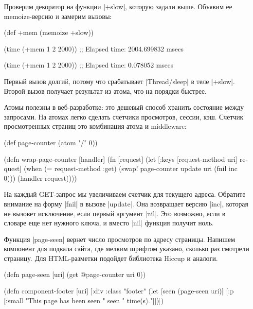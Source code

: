Проверим декоратор на функции \spverb|+slow|, которую задали выше. Объявим ее
memoize-версию и замерим вызовы:

\begin{english}
  \begin{clojure}
(def +mem (memoize +slow))

(time (+mem 1 2 2000))
;; Elapsed time: 2004.699832 msecs

(time (+mem 1 2 2000))
;; Elapsed time: 0.078052 msecs
  \end{clojure}
\end{english}

Первый вызов долгий, потому что срабатывает \spverb|Thread/sleep| в теле
\spverb|+slow|. Второй вызов получает результат из атома, что на порядки
быстрее.

Атомы полезны в веб-разработке: это дешевый способ хранить состояние между
запросами. На атомах легко сделать счетчики просмотров, сессии, кэш. Счетчик
просмотренных страниц это комбинация атома и middleware:

\begin{english}
  \begin{clojure}
(def page-counter
  (atom {"/" 0}))

(defn wrap-page-counter
  [handler]
  (fn [request]
    (let [{:keys [request-method uri]} request]
      (when (= request-method :get)
        (swap! page-counter update uri (fnil inc 0)))
      (handler request))))
  \end{clojure}
\end{english}

На каждый GET-запрос мы увеличиваем счетчик для текущего адреса. Обратите
внимание на форму \spverb|fnil| в вызове \spverb|update|. Она возвращает версию
\spverb|inc|, которая не вызовет исключение, если первый аргумент
\spverb|nil|. Это возможно, если в словаре еще нет нужного ключа, и вместо
\spverb|nil| функция получит ноль.

Функция \spverb|page-seen| вернет число просмотров по адресу страницы. Напишем
компонент для подвала сайта, где мелким шрифтом указано, сколько раз смотрели
страницу. Для HTML-разметки подойдет библиотека
Hiccup и аналоги.

\begin{english}
  \begin{clojure}
(defn page-seen [uri]
  (get @page-counter uri 0))

(defn component-footer [uri]
  [:div {:class "footer"}
   (let [seen (page-seen uri)]
     [:p [:small "This page has been seen " seen " time(s)."]])])
  \end{clojure}
\end{english}

